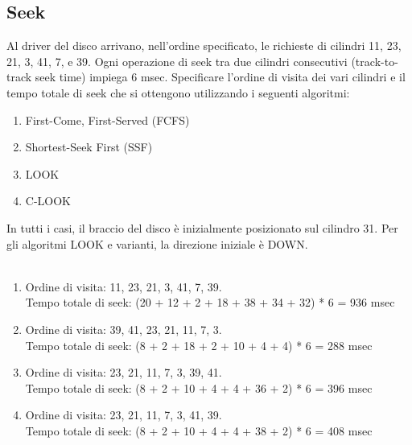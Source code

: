 \documentclass[12pt]{article}
\begin{document}
\subsection{Seek}
Al driver del disco arrivano, nell'ordine specificato, le richieste di cilindri 11, 23, 21, 3, 41, 7, e 39.
Ogni operazione di seek tra due cilindri consecutivi (track-to-track seek time) impiega 6 msec.
Specificare l'ordine di visita dei vari cilindri e il tempo totale di seek che si ottengono utilizzando i
seguenti algoritmi:
\begin{enumerate}
    \item First-Come, First-Served (FCFS)
    \item Shortest-Seek First (SSF)
    \item LOOK
    \item C-LOOK
\end{enumerate}
In tutti i casi, il braccio del disco è inizialmente posizionato sul cilindro 31. Per gli algoritmi LOOK
e varianti, la direzione iniziale è DOWN.\\\\
\begin{enumerate}
    \color{blue}
    \item Ordine di visita: 11, 23, 21, 3, 41, 7, 39.\\ Tempo totale di seek: (20 + 12 + 2 + 18 + 38 + 34 + 32) * 6 =  936 msec
    \item Ordine di visita: 39, 41, 23, 21, 11, 7, 3. \\Tempo totale di seek: (8 + 2 + 18 + 2 + 10 + 4 + 4) * 6 = 288 msec
    \item Ordine di visita: 23, 21, 11, 7, 3, 39, 41. \\Tempo totale di seek: (8 + 2 + 10 + 4 + 4 + 36 + 2) * 6 = 396 msec
    \item Ordine di visita: 23, 21, 11, 7, 3, 41, 39. \\Tempo totale di seek: (8 + 2 + 10 + 4 + 4 + 38 + 2) * 6 = 408 msec
\end{enumerate}
\end{document}
